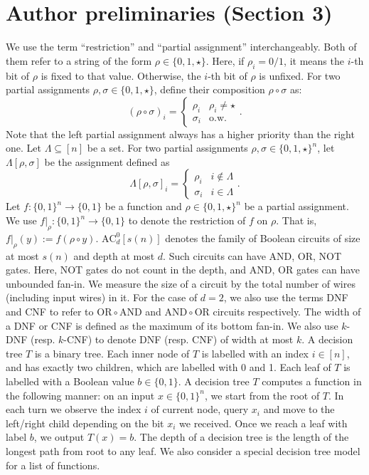 \documentclass[10pt,a4paper]{article}
\begin{document}
\section*{Author preliminaries (Section 3)}
We use the term ``restriction'' and ``partial assignment'' interchangeably. Both of them refer to a string of the form $\rho\in\{0,1,\star\}$. Here, if $\rho_i=0/1$, it means the $i$-th bit of $\rho$ is fixed to that value. Otherwise, the $i$-th bit of $\rho$ is unfixed. For two partial assignments $\rho,\sigma\in\{0,1,\star\}$, define their composition $\rho\circ\sigma$ as:
\[(\rho\circ\sigma)_i=\begin{cases}\rho_i&\rho_i\ne\star\\\sigma_i&\text{o.w.}\end{cases}.\]
Note that the left partial assignment always has a higher priority than the right one. Let $\Lambda\subseteq[n]$ be a set. For two partial assignments $\rho,\sigma\in\{0,1,\star\}^n$, let $\Lambda[\rho,\sigma]$ be the assignment defined as
\[\Lambda[\rho,\sigma]_i=\begin{cases}\rho_i&i\notin\Lambda\\\sigma_i&i\in\Lambda\end{cases}.\]
Let $f:\{0,1\}^n\to\{0,1\}$ be a function and $\rho\in\{0,1,\star\}^n$ be a partial assignment. We use $f|_\rho:\{0,1\}^n\to\{0,1\}$ to denote the restriction of $f$ on $\rho$. That is, $f|_\rho(y):=f(\rho\circ y)$.
$\mathrm{AC}^0_d[s(n)]$ denotes the family of Boolean circuits of size at most $s(n)$ and depth at most $d$. Such circuits can have AND, OR, NOT gates. Here, NOT gates do not count in the depth, and AND, OR gates can have unbounded fan-in. We measure the size of a circuit by the total number of wires (including input wires) in it. For the case of $d=2$, we also use the terms DNF and CNF to refer to $\mathrm{OR}\circ\mathrm{AND}$ and $\mathrm{AND}\circ\mathrm{OR}$ circuits respectively. The width of a DNF or CNF is defined as the maximum of its bottom fan-in. We also use $k$-DNF (resp. $k$-CNF) to denote DNF (resp. CNF) of width at most $k$.
A decision tree $T$ is a binary tree. Each inner node of $T$ is labelled with an index $i\in[n]$, and has exactly two children, which are labelled with 0 and 1. Each leaf of $T$ is labelled with a Boolean value $b\in\{0,1\}$. A decision tree $T$ computes a function in the following manner: on an input $x\in\{0,1\}^n$, we start from the root of $T$. In each turn we observe the index $i$ of current node, query $x_i$ and move to the left/right child depending on the bit $x_i$ we received. Once we reach a leaf with label $b$, we output $T(x)=b$. The depth of a decision tree is the length of the longest path from root to any leaf. We also consider a special decision tree model for a list of functions.
\end{document}

